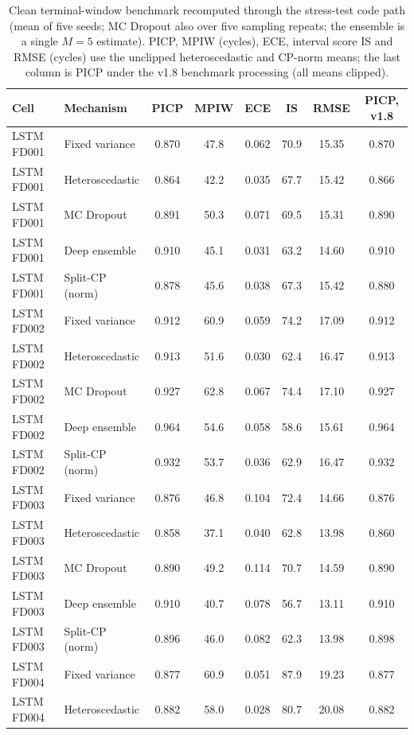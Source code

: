 \documentclass[10pt,a4paper]{article}
\begin{document}
\begin{table}[H]\centering\scriptsize
\caption{Clean terminal-window benchmark recomputed through the stress-test code path (mean of five seeds; MC Dropout also over five sampling repeats; the ensemble is a single $M=5$ estimate). PICP, MPIW (cycles), ECE, interval score IS and RMSE (cycles) use the unclipped heteroscedastic and CP-norm means; the last column is PICP under the v1.8 benchmark processing (all means clipped).}\label{tab:samepath}
\begin{tabular}{llccccc|c}\toprule Cell & Mechanism & PICP & MPIW & ECE & IS & RMSE & PICP, v1.8 \\ \midrule
LSTM FD001 & Fixed variance & 0.870 & 47.8 & 0.062 & 70.9 & 15.35 & 0.870 \\
LSTM FD001 & Heteroscedastic & 0.864 & 42.2 & 0.035 & 67.7 & 15.42 & 0.866 \\
LSTM FD001 & MC Dropout & 0.891 & 50.3 & 0.071 & 69.5 & 15.31 & 0.890 \\
LSTM FD001 & Deep ensemble & 0.910 & 45.1 & 0.031 & 63.2 & 14.60 & 0.910 \\
LSTM FD001 & Split-CP (norm) & 0.878 & 45.6 & 0.038 & 67.3 & 15.42 & 0.880 \\
\midrule
LSTM FD002 & Fixed variance & 0.912 & 60.9 & 0.059 & 74.2 & 17.09 & 0.912 \\
LSTM FD002 & Heteroscedastic & 0.913 & 51.6 & 0.030 & 62.4 & 16.47 & 0.913 \\
LSTM FD002 & MC Dropout & 0.927 & 62.8 & 0.067 & 74.4 & 17.10 & 0.927 \\
LSTM FD002 & Deep ensemble & 0.964 & 54.6 & 0.058 & 58.6 & 15.61 & 0.964 \\
LSTM FD002 & Split-CP (norm) & 0.932 & 53.7 & 0.036 & 62.9 & 16.47 & 0.932 \\
\midrule
LSTM FD003 & Fixed variance & 0.876 & 46.8 & 0.104 & 72.4 & 14.66 & 0.876 \\
LSTM FD003 & Heteroscedastic & 0.858 & 37.1 & 0.040 & 62.8 & 13.98 & 0.860 \\
LSTM FD003 & MC Dropout & 0.890 & 49.2 & 0.114 & 70.7 & 14.59 & 0.890 \\
LSTM FD003 & Deep ensemble & 0.910 & 40.7 & 0.078 & 56.7 & 13.11 & 0.910 \\
LSTM FD003 & Split-CP (norm) & 0.896 & 46.0 & 0.082 & 62.3 & 13.98 & 0.898 \\
\midrule
LSTM FD004 & Fixed variance & 0.877 & 60.9 & 0.051 & 87.9 & 19.23 & 0.877 \\
LSTM FD004 & Heteroscedastic & 0.882 & 58.0 & 0.028 & 80.7 & 20.08 & 0.882 \\

\end{tabular}
\end{table}
\end{document}
